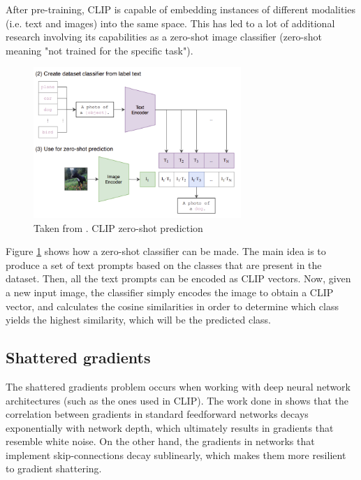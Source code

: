 After pre-training, CLIP is capable of embedding instances of different modalities (i.e. text and images) into the same space. This has led to a lot of additional research involving its capabilities as a zero-shot image classifier (zero-shot meaning "not trained for the specific task").
\begin{figure}[H]
    \centering
    \includegraphics[width=0.7\textwidth]{figures/clip-zeroshot.png}
    \caption{Taken from \cite{radford2021}. CLIP zero-shot prediction}
    \label{fig:clip-zeroshot}
\end{figure}

Figure \ref{fig:clip-zeroshot} shows how a zero-shot classifier can be made. The main idea is to produce a set of text prompts based on the classes that are present in the dataset. Then, all the text prompts can be encoded as CLIP vectors. Now, given a new input image, the classifier simply encodes the image to obtain a CLIP vector, and calculates the cosine similarities in order to determine which class yields the highest similarity, which will be the predicted class.

\subsection{Shattered gradients}
\label{sec:shattered-gradients}
The shattered gradients problem occurs when working with deep neural network architectures (such as the ones used in CLIP). The work done in \cite{balduzzi2017} shows that the correlation between gradients in standard feedforward networks decays exponentially with network depth, which ultimately results in gradients that resemble white noise. On the other hand, the gradients in networks that implement skip-connections decay sublinearly, which makes them more resilient to gradient shattering.


